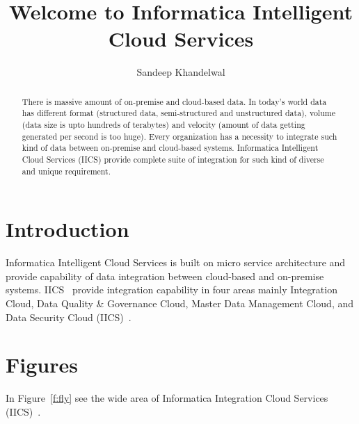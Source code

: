 \title{Welcome to Informatica Intelligent Cloud Services}


\author{Sandeep Khandelwal}

\renewcommand{\shortauthors}{S. Khandelwal}


\begin{abstract}
	
There is massive amount of on-premise and cloud-based data. In today's world data has different format (structured data, semi-structured and unstructured data), volume (data size is upto hundreds of terabytes) and velocity (amount of data getting generated per second is too huge). Every organization has a necessity to integrate such kind of data between on-premise and cloud-based systems. Informatica Intelligent Cloud Services (IICS) provide complete suite of integration for such kind of diverse and unique requirement.

\end{abstract}



\maketitle


\section{Introduction}

Informatica Intelligent Cloud Services is built on micro service architecture and provide 
capability of data integration between cloud-based and on-premise systems. IICS~\cite{hid-sp18-511-iics} provide integration capability in four areas mainly Integration Cloud, Data Quality & Governance Cloud, Master Data Management Cloud, and Data Security Cloud (IICS)~\cite{hid-sp18-511-iics}. 

\section{Figures}

In Figure~\ref{f:fly} see the wide area of Informatica Integration Cloud Services (IICS)~\cite{hid-sp18-511-iics}.

